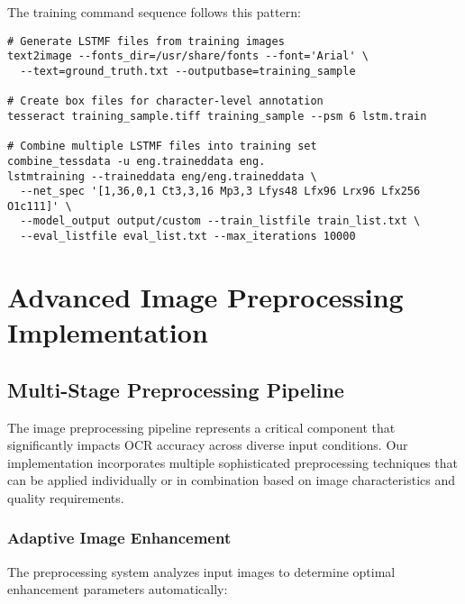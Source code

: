 The training command sequence follows this pattern:

\begin{verbatim}
# Generate LSTMF files from training images
text2image --fonts_dir=/usr/share/fonts --font='Arial' \
  --text=ground_truth.txt --outputbase=training_sample

# Create box files for character-level annotation
tesseract training_sample.tiff training_sample --psm 6 lstm.train

# Combine multiple LSTMF files into training set
combine_tessdata -u eng.traineddata eng.
lstmtraining --traineddata eng/eng.traineddata \
  --net_spec '[1,36,0,1 Ct3,3,16 Mp3,3 Lfys48 Lfx96 Lrx96 Lfx256 O1c111]' \
  --model_output output/custom --train_listfile train_list.txt \
  --eval_listfile eval_list.txt --max_iterations 10000
\end{verbatim}

\section{Advanced Image Preprocessing Implementation}

\subsection{Multi-Stage Preprocessing Pipeline}

The image preprocessing pipeline represents a critical component that significantly impacts OCR accuracy across diverse input conditions. Our implementation incorporates multiple sophisticated preprocessing techniques that can be applied individually or in combination based on image characteristics and quality requirements.

\subsubsection{Adaptive Image Enhancement}

The preprocessing system analyzes input images to determine optimal enhancement parameters automatically:

